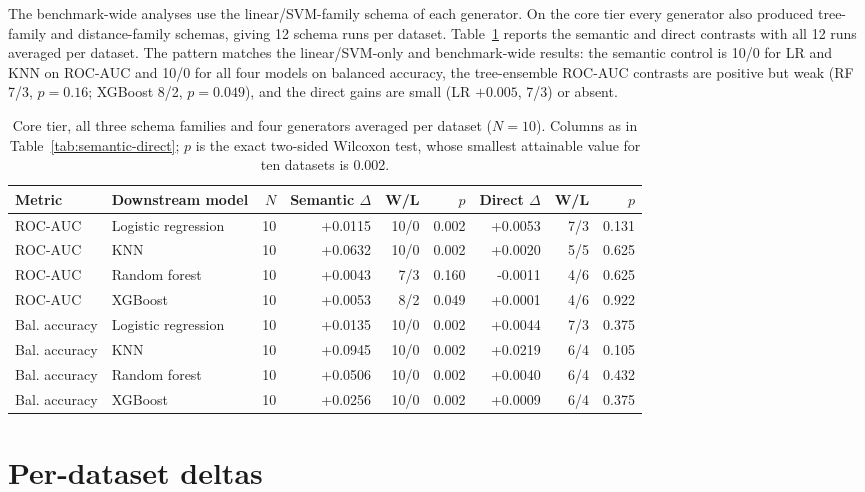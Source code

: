 The benchmark-wide analyses use the linear/SVM-family schema of each generator. On the core tier every generator also produced tree-family and distance-family schemas, giving 12 schema runs per dataset. Table~\ref{tab:core-families} reports the semantic and direct contrasts with all 12 runs averaged per dataset. The pattern matches the linear/SVM-only and benchmark-wide results: the semantic control is 10/0 for LR and KNN on ROC-AUC and 10/0 for all four models on balanced accuracy, the tree-ensemble ROC-AUC contrasts are positive but weak (RF 7/3, \(p = 0.16\); XGBoost 8/2, \(p = 0.049\)), and the direct gains are small (LR \(+0.005\), 7/3) or absent.


\begin{table}[htbp]
\caption{Core tier, all three schema families and four generators averaged per dataset ($N = 10$). Columns as in Table~\ref{tab:semantic-direct}; $p$ is the exact two-sided Wilcoxon test, whose smallest attainable value for ten datasets is 0.002.}\label{tab:core-families}
\centering
\small
\begin{adjustbox}{max width=\linewidth}
\begin{tabular}{llrrrrrrr}
\toprule
Metric & Downstream model & \(N\) & Semantic \(\Delta\) & W/L & \(p\) & Direct \(\Delta\) & W/L & \(p\) \\
\midrule
ROC-AUC & Logistic regression & 10 & +0.0115 & 10/0 & 0.002 & +0.0053 & 7/3 & 0.131 \\
ROC-AUC & KNN & 10 & +0.0632 & 10/0 & 0.002 & +0.0020 & 5/5 & 0.625 \\
ROC-AUC & Random forest & 10 & +0.0043 & 7/3 & 0.160 & -0.0011 & 4/6 & 0.625 \\
ROC-AUC & XGBoost & 10 & +0.0053 & 8/2 & 0.049 & +0.0001 & 4/6 & 0.922 \\
\midrule
Bal. accuracy & Logistic regression & 10 & +0.0135 & 10/0 & 0.002 & +0.0044 & 7/3 & 0.375 \\
Bal. accuracy & KNN & 10 & +0.0945 & 10/0 & 0.002 & +0.0219 & 6/4 & 0.105 \\
Bal. accuracy & Random forest & 10 & +0.0506 & 10/0 & 0.002 & +0.0040 & 6/4 & 0.432 \\
Bal. accuracy & XGBoost & 10 & +0.0256 & 10/0 & 0.002 & +0.0009 & 6/4 & 0.375 \\
\bottomrule
\end{tabular}
\end{adjustbox}
\end{table}

\section{Per-dataset deltas}\label{app:per-dataset}

